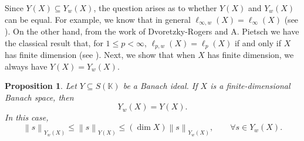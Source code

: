 \documentclass[14pt, a4paper]{article}  %
\providecommand{\pare}[1]{\left( #1\right) }
\providecommand{\norm}[1]{\left\lVert#1\right\rVert}
\newcommand{\K}{\mathbb{K}}
\newtheorem{proposition}{Proposition}[section]
\newtheorem{theorem}{Theorem}[section]
\begin{document}
		 Since $Y(X) \subseteq Y_w(X)$, the question arises as to whether $Y(X)$ and $Y_w(X)$ can be equal. For example, we know that in general $\ell_{\infty,w}\pare{X}=\ell_{\infty}\pare{X}$ (see \cite[p.~33]{DJT}). On the other hand, from the work of Dvoretzky-Rogers and A. Pietsch we have the classical result that, for $1 \leq p < \infty$, $\ell_{p,w}(X) = \ell_p(X)$ if and only if $X$ has finite dimension (see \cite[p.~50]{DJT}). Next, we show that when $X$ has finite dimension, we always have $Y(X) = Y_w(X)$.
		 
		 
		 
		 \begin{proposition}\label{efren4}
		 	Let $Y\subseteq S\pare{\K}$ be a Banach ideal. If $X$ is a finite-dimensional Banach space, then
		 	\begin{equation}
		 		Y_{w}\pare{X}=Y\pare{X}.
		 	\end{equation}
		 	In this case,
		 	\begin{equation}\label{final5}
		 		\norm{s}_{Y_{w}\pare{X}}\leq \norm{s}_{Y\pare{X}}\leq \pare{\dim X}\norm{s}_{Y_{w}\pare{X}},\qquad \forall s\in Y_{w}\pare{X}.
		 	\end{equation}
		 \end{proposition}
		 
\end{document}
